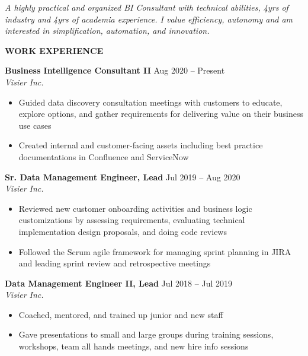 \documentclass{res}
\renewcommand{\section}[1]{%
  \vspace{0.3in}%
  \centerline{\uppercase{\bf{#1}}}%
  \vspace{-6pt}}
\begin{document}
\begin{resume}


\vspace{-1em}
\begin{center}
  {\it A highly practical and organized BI Consultant with technical abilities, 4yrs of industry and 4yrs of academia experience. I value efficiency, autonomy and am interested in simplification, automation, and innovation.}
\end{center}
\vspace{-1.5em}

\section{Work Experience}

{\bf Business Intelligence Consultant II} \hfill Aug 2020 -- Present\\
{\it Visier Inc.}
\begin{itemize}
  \item Guided data discovery consultation meetings with customers to educate, explore options, and gather requirements for delivering value on their business use cases
  \item Created internal and customer-facing assets including best practice documentations in Confluence and ServiceNow
\end{itemize}

{\bf Sr. Data Management Engineer, Lead} \hfill Jul 2019 -- Aug 2020\\
{\it Visier Inc.}
\begin{itemize}
  \item Reviewed new customer onboarding activities and business logic customizations by assessing requirements, evaluating technical implementation design proposals, and doing code reviews
  \item Followed the Scrum agile framework for managing sprint planning in JIRA and leading sprint review and retrospective meetings
\end{itemize}

{\bf Data Management Engineer II, Lead} \hfill Jul 2018 -- Jul 2019\\
{\it Visier Inc.}
\begin{itemize}
  \item Coached, mentored, and trained up junior and new staff
  \item Gave presentations to small and large groups during training sessions, workshops, team all hands meetings, and new hire info sessions
\end{itemize}


\end{resume}
\end{document}
